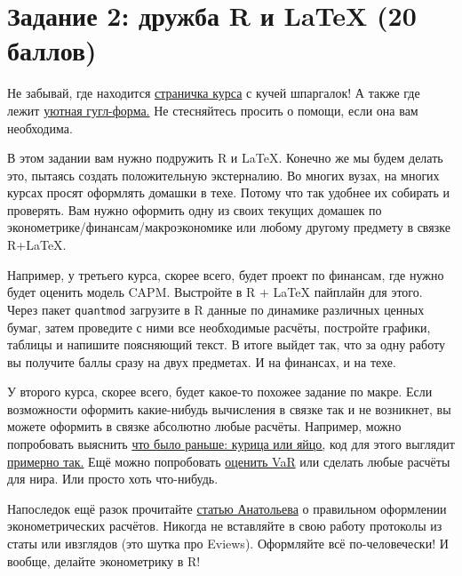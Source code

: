 \documentclass[12pt, a4paper, oneside]{article}
\begin{document}
	
\section*{Задание 2:  дружба R и LaTeX (20  баллов) }

Не забывай, где находится  \href{https://github.com/FUlyankin/LaTeX}{страничка курса} с кучей шпаргалок! А также где лежит \href{https://docs.google.com/forms/d/e/1FAIpQLSe11kxKVfv07iCL1E9yNX7ll9swKImiVwRr1H70lslGzInRSg/viewform}{уютная гугл-форма.} Не стесняйтесь просить о помощи, если она вам необходима. 

В этом задании вам нужно подружить R и \LaTeX{}. Конечно же мы будем делать это, пытаясь создать положительную экстерналию. Во многих вузах, на многих курсах просят оформлять домашки в техе. Потому что так удобнее их собирать и проверять. Вам нужно оформить одну из своих текущих домашек по эконометрике/финансам/макроэкономике или любому другому предмету в связке R+\LaTeX.

Например, у третьего курса, скорее всего, будет проект по финансам, где нужно будет оценить модель CAPM. Выстройте в R + \LaTeX{} пайплайн для этого. Через пакет \texttt{quantmod}  загрузите в R данные по динамике различных ценных бумаг, затем проведите с ними все необходимые расчёты, постройте графики, таблицы и напишите поясняющий текст. В итоге выйдет так, что за одну работу вы получите баллы сразу на двух предметах. И на финансах, и на техе. 

У второго курса, скорее всего, будет какое-то похожее задание по макре. Если возможности оформить какие-нибудь вычисления в связке так и не возникнет, вы можете оформить в связке абсолютно любые расчёты. Например, можно попробовать выяснить \href{http://www.algorithmist.ru/2011/01/chickens-eggs-and-causality-or-which.html}{что было раньше: курица или яйцо,}  код для этого выглядит \href{https://www.r-bloggers.com/2013/06/chicken-or-the-egg-granger-causality-for-the-masses/}{примерно так.} Ещё можно попробовать \href{https://rpubs.com/iezepov}{оценить VaR} или сделать любые расчёты для нира. Или просто хоть что-нибудь. 

Напоследок ещё разок прочитайте \href{https://github.com/FUlyankin/LaTeX/raw/master/Logi_2018/sem_5/Anatolyev.pdf}{статью Анатольева} о правильном оформлении эконометрических расчётов. Никогда не вставляйте в свою работу протоколы из статы или ивзглядов (это шутка про Eviews). Оформляйте всё по-человечески!  И вообще, делайте эконометрику в R!
\end{document}
